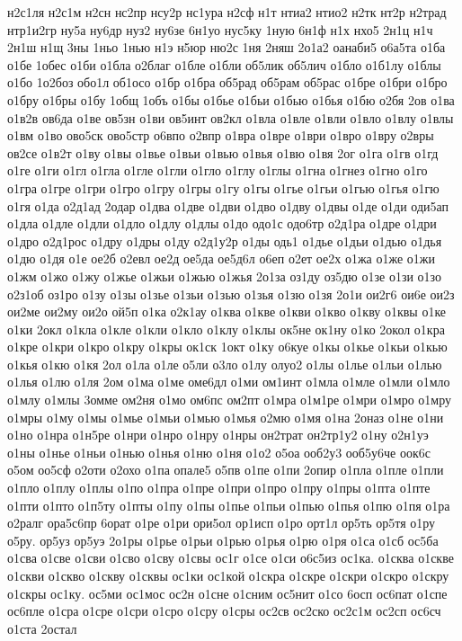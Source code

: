 {н2с1ля
н2с1м
н2сн
нс2пр
нсу2р
нс1ура
н2сф
н1т
нтиа2
нтио2
н2тк
нт2р
н2трад
нтр1и2гр
ну5а
ну6др
нуз2
ну6зе
6н1уо
нус5ку
1ную
6н1ф
н1х
нхо5
2н1ц
н1ч
2н1ш
н1щ
3ны
1ньо
1нью
н1э
н5юр
ню2с
1ня
2няш
2о1а2
оанаби5
о6а5та
о1ба
о1бе
1обес
о1би
о1бла
о2благ
о1бле
о1бли
об5лик
об5лич
о1бло
о1б1лу
о1блы
о1бо
1о2боз
обо1л
об1осо
о1бр
о1бра
об5рад
об5рам
об5рас
о1бре
о1бри
о1бро
о1бру
о1бры
о1бу
1общ
1объ
о1бы
о1бье
о1бьи
о1бью
о1бья
о1бю
о2бя
2ов
о1ва
о1в2в
ов6да
о1ве
ов5зн
о1ви
ов5инт
ов2кл
о1вла
о1вле
о1вли
о1вло
о1влу
о1влы
о1вм
о1во
ово5ск
ово5стр
о6впо
о2впр
о1вра
о1вре
о1ври
о1вро
о1вру
о2вры
ов2се
о1в2т
о1ву
о1вы
о1вье
о1вьи
о1вью
о1вья
о1вю
о1вя
2ог
о1га
о1гв
о1гд
о1ге
о1ги
о1гл
о1гла
о1гле
о1гли
о1гло
о1глу
о1глы
о1гна
о1гнез
о1гно
о1го
о1гра
о1гре
о1гри
о1гро
о1гру
о1гры
о1гу
о1гы
о1гье
о1гьи
о1гью
о1гья
о1гю
о1гя
о1да
о2д1ад
2одар
о1два
о1две
о1дви
о1дво
о1дву
о1двы
о1де
о1ди
оди5ап
о1дла
о1дле
о1дли
о1дло
о1длу
о1длы
о1до
одо1с
одо6тр
о2д1ра
о1дре
о1дри
о1дро
о2д1рос
о1дру
о1дры
о1ду
о2д1у2р
о1ды
одь1
о1дье
о1дьи
о1дью
о1дья
о1дю
о1дя
о1е
ое2б
о2евл
ое2д
ое5да
ое5д6л
о6еп
о2ет
ое2х
о1жа
о1же
о1жи
о1жм
о1жо
о1жу
о1жье
о1жьи
о1жью
о1жья
2о1за
оз1ду
оз5дю
о1зе
о1зи
о1зо
о2з1об
оз1ро
о1зу
о1зы
о1зье
о1зьи
о1зью
о1зья
о1зю
о1зя
2о1и
ои2г6
ои6е
ои2з
ои2ме
ои2му
ои2о
ой5п
о1ка
о2к1ау
о1ква
о1кве
о1кви
о1кво
о1кву
о1квы
о1ке
о1ки
2окл
о1кла
о1кле
о1кли
о1кло
о1клу
о1клы
ок5не
ок1ну
о1ко
2окол
о1кра
о1кре
о1кри
о1кро
о1кру
о1кры
ок1ск
1окт
о1ку
о6куе
о1кы
о1кье
о1кьи
о1кью
о1кья
о1кю
о1кя
2ол
о1ла
о1ле
о5ли
о3ло
о1лу
олуо2
о1лы
о1лье
о1льи
о1лью
о1лья
о1лю
о1ля
2ом
о1ма
о1ме
оме6дл
о1ми
ом1инт
о1мла
о1мле
о1мли
о1мло
о1млу
о1млы
3омме
ом2ня
о1мо
ом6пс
ом2пт
о1мра
о1м1ре
о1мри
о1мро
о1мру
о1мры
о1му
о1мы
о1мье
о1мьи
о1мью
о1мья
о2мю
о1мя
о1на
2оназ
о1не
о1ни
о1но
о1нра
о1н5ре
о1нри
о1нро
о1нру
о1нры
он2трат
он2тр1у2
о1ну
о2н1уэ
о1ны
о1нье
о1ньи
о1нью
о1нья
о1ню
о1ня
о1о2
о5оа
ооб2у3
ооб5у6че
оок6с
о5ом
оо5сф
о2оти
о2охо
о1па
опале5
о5пв
о1пе
о1пи
2опир
о1пла
о1пле
о1пли
о1пло
о1плу
о1плы
о1по
о1пра
о1пре
о1при
о1про
о1пру
о1пры
о1пта
о1пте
о1пти
о1пто
о1п5ту
о1пты
о1пу
о1пы
о1пье
о1пьи
о1пью
о1пья
о1пю
о1пя
о1ра
о2ралг
ора5с6пр
6орат
о1ре
о1ри
ори5ол
ор1исп
о1ро
орт1л
ор5ть
ор5тя
о1ру
о5ру.
ор5уз
ор5уэ
2о1ры
о1рье
о1рьи
о1рью
о1рья
о1рю
о1ря
о1са
о1сб
ос5ба
о1сва
о1све
о1сви
о1сво
о1сву
о1свы
ос1г
о1се
о1си
о6с5из
ос1ка.
о1сква
о1скве
о1скви
о1скво
о1скву
о1сквы
ос1ки
ос1кой
о1скра
о1скре
о1скри
о1скро
о1скру
о1скры
ос1ку.
ос5ми
ос1мос
ос2н
о1сне
о1сним
ос5нит
о1со
6осп
ос6пат
о1спе
ос6пле
о1сра
о1сре
о1сри
о1сро
о1сру
о1сры
ос2св
ос2ско
ос2с1м
ос2сп
ос6сч
о1ста
2остал
}
